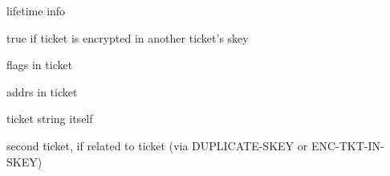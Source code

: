 \documentclass[letterpaper,10pt,english]{sphinxmanual}
\begin{document}
\begin{fulllineitems}
\label{appdev/refs/types/krb5_creds:krb5_creds.times}
lifetime info

\end{fulllineitems}


\begin{fulllineitems}
\label{appdev/refs/types/krb5_creds:krb5_creds.is_skey}
true if ticket is encrypted in another ticket's skey

\end{fulllineitems}


\begin{fulllineitems}
\label{appdev/refs/types/krb5_creds:krb5_creds.ticket_flags}
flags in ticket

\end{fulllineitems}


\begin{fulllineitems}
\label{appdev/refs/types/krb5_creds:krb5_creds.addresses}
addrs in ticket

\end{fulllineitems}


\begin{fulllineitems}
\label{appdev/refs/types/krb5_creds:krb5_creds.ticket}
ticket string itself

\end{fulllineitems}


\begin{fulllineitems}
\label{appdev/refs/types/krb5_creds:krb5_creds.second_ticket}
second ticket, if related to ticket (via DUPLICATE-SKEY or ENC-TKT-IN-SKEY)

\end{fulllineitems}
\end{document}
